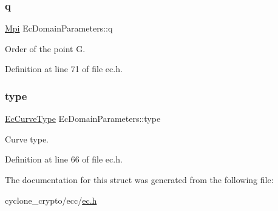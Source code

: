 \subsubsection{\texorpdfstring{q}{q}}
{\footnotesize\ttfamily \hyperlink{structMpi}{Mpi} Ec\+Domain\+Parameters\+::q}



Order of the point G. 



Definition at line 71 of file ec.\+h.

\mbox{\label{structEcDomainParameters_a7e42fa63fdb0ee92990c05b0771ac383}} 
\subsubsection{\texorpdfstring{type}{type}}
{\footnotesize\ttfamily \hyperlink{ec__curves_8h_af38fa6633c02444318870a309134ca21}{Ec\+Curve\+Type} Ec\+Domain\+Parameters\+::type}



Curve type. 



Definition at line 66 of file ec.\+h.



The documentation for this struct was generated from the following file\+:\begin{DoxyCompactItemize}
\item 
cyclone\+\_\+crypto/ecc/\hyperlink{ec_8h}{ec.\+h}\end{DoxyCompactItemize}
